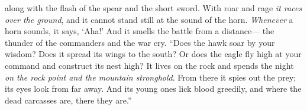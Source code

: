 \begin{biblechapter}
along with the flash of the spear and the short sword.
\verse With roar and rage \textit{it races over the ground}, 
and it cannot stand still at the sound of the horn.
\verse \textit{Whenever} a horn sounds, it says, ‘Aha!’ 
And it smells the battle from a distance— 
the thunder of the commanders and the war cry.
\verse “Does the hawk soar by your wisdom? 
Does it spread its wings to the south?
\verse Or does the eagle fly high at your command 
and construct its nest high?
\verse It lives on the rock and spends the night 
\textit{on the rock point and the mountain stronghold}.
\verse From there it spies out the prey; 
its eyes look from far away.
\verse And its young ones lick blood greedily, 
and where the dead carcasses are, there they are.”
\end{biblechapter}

